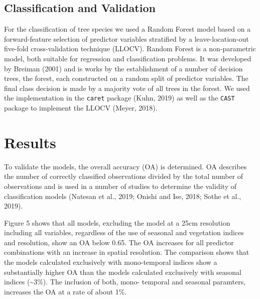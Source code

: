 \documentclass[]{article}
\begin{document}
\hypertarget{classification-and-validation}{%
\subsection{Classification and
Validation}\label{classification-and-validation}}

For the classification of tree species we used a Random Forest model
based on a forward-feature selection of predictor variables stratified
by a leave-location-out five-fold cross-validation technique (LLOCV).
Random Forest is a non-parametric model, both suitable for regression
and classification problems. It was developed by Breiman (2001) and is
works by the establishment of a number of decision trees, the forest,
each constructed on a random split of predictor variables. The final
class decision is made by a majority vote of all trees in the forest. We
used the implementation in the \texttt{caret} package (Kuhn, 2019) as
well as the \texttt{CAST} package to implement the LLOCV (Meyer, 2018).

\hypertarget{results}{%
\section{Results}\label{results}}

To validate the models, the overall accuracy (OA) is determined. OA
describes the number of correctly classified observations divided by the
total number of observations and is used in a number of studies to
determine the validity of classification models (Natesan et al., 2019;
Onishi and Ise, 2018; Sothe et al., 2019).

Figure 5 shows that all models, excluding the model at a 25cm resolution
including all variables, regardless of the use of seasonal and
vegetation indices and resolution, show an OA below 0.65. The OA
increases for all predictor combinations with an increase in spatial
resolution. The comparison shows that the models calculated exclusively
with mono-temporal indices show a substantially higher OA than the
models calculated exclusively with seasonal indices
(\textasciitilde{}3\%). The inclusion of both, mono- temporal and
seasonal paramters, increases the OA at a rate of about 1\%.
\end{document}
